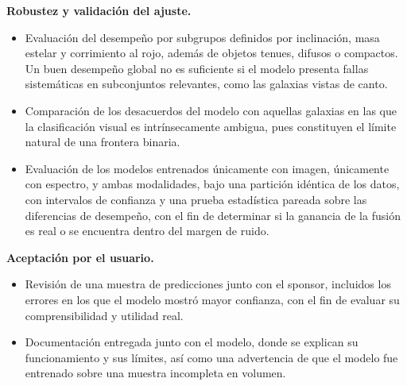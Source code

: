 \textbf{Robustez y validación del ajuste.}

\begin{itemize}
    \item Evaluación del desempeño por subgrupos definidos por inclinación, masa estelar y corrimiento al rojo, además de objetos tenues, difusos o compactos. Un buen desempeño global no es suficiente si el modelo presenta fallas sistemáticas en subconjuntos relevantes, como las galaxias vistas de canto.
    \item Comparación de los desacuerdos del modelo con aquellas galaxias en las que la clasificación visual es intrínsecamente ambigua, pues constituyen el límite natural de una frontera binaria.
    \item Evaluación de los modelos entrenados únicamente con imagen, únicamente con espectro, y ambas modalidades, bajo una partición idéntica de los datos, con intervalos de confianza y una prueba estadística pareada sobre las diferencias de desempeño, con el fin de determinar si la ganancia de la fusión es real o se encuentra dentro del margen de ruido.
\end{itemize}


\textbf{Aceptación por el usuario.}

\begin{itemize}
    \item Revisión de una muestra de predicciones junto con el sponsor, incluidos los errores en los que el modelo mostró mayor confianza, con el fin de evaluar su comprensibilidad y utilidad real.
    \item Documentación entregada junto con el modelo, donde se explican su funcionamiento y sus límites, así como una advertencia de que el modelo fue entrenado sobre una muestra incompleta en volumen.
\end{itemize}


